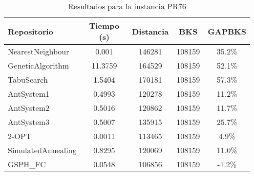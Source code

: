\begin{table}[H]
\centering
\caption{Resultados para la instancia PR76}
\begin{tabular}{|l|c|c|c|c|}
\hline
\textbf{Repositorio} & \textbf{Tiempo (s)} & \textbf{Distancia} & \textbf{BKS} & \textbf{GAPBKS} \\ 
\hline
NearestNeighbour & 0.001 & 146281 & 108159 & 35.2\% \\ 
GeneticAlgorithm & 11.3759 & 164529 & 108159 & 52.1\% \\ 
TabuSearch & 1.5404 & 170181 & 108159 & 57.3\% \\ 
AntSystem1 & 0.4993 & 120278 & 108159 & 11.2\% \\ 
AntSystem2 & 0.5016 & 120862 & 108159 & 11.7\% \\ 
AntSystem3 & 0.5007 & 135915 & 108159 & 25.7\% \\ 
2-OPT & 0.0011 & 113465 & 108159 & 4.9\% \\ 
SimulatedAnnealing & 0.8295 & 120069 & 108159 & 11.0\% \\ 
GSPH_FC & 0.0548 & 106856 & 108159 & -1.2\% \\ 
\hline
\end{tabular}
\end{table}
